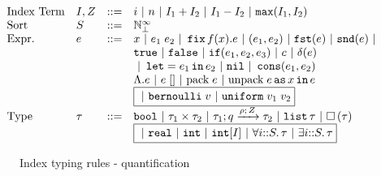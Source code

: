 \documentclass[a4paper,11pt]{article}
\theoremstyle{definition}
\begin{document}
\[\begin{array}{llll}
\mbox{Index Term} & \idx, \nnatA & ::= &     i ~|~ n ~|~ \idx_1 + \idx_2 ~|~  \idx_1
                                 - \idx_2 ~|~ \smax{\idx_1}{\idx_2}\\
  \mbox{Sort} & S & ::= & \natbi \\
\mbox{Expr.} & \expr & ::= & x ~|~ \expr_1 \eapp \expr_2 ~|~ \efix f(x).\expr
 						~|~ (\expr_1, \expr_2) ~|~ \eprojl(\expr) ~|~ \eprojr(\expr) ~| \\
%
& & & 					\etrue ~|~ \efalse ~|~ \eif(\expr_1, \expr_2, \expr_3) 
						~|~ \econst ~|~ \eop(\expr) \\
& & & 					~|~ \elet  = \expr_1 \ein \expr_2 ~|~ \enil ~|~  \econs (
      					\expr_1, \expr_2)  \\
& & &  \eilam \expr  ~|~  \expr \eapp []  ~|~
                            \epack \expr ~|~ \eunpack \expr \eas x
                            \ein \expr \\
& & & \boxed{~|~ \bernoulli \eapp \valr ~|~ \uniform \eapp \valr_1 \eapp \valr_2}\\      
%
  \mbox{Type} & \type & ::= & \tbool ~|~ \type_1 \times
  \type_2 ~|~ \tarr{\type_1}{\type_2}{\nnatbiA}{\dmap}{\nnatA} ~|~
                              \tlist{\type} ~|~ \tbox{\type}\\
& & &                  \boxed{ ~|~  \treal ~|~	\tint ~|~   \tint[I]  ~|~      \tforall{i} \type  ~|~ \texists{i} \type      } 
%
\end{array}\]
\begin{figure}
  \caption{Index typing rules - quantification}
  \label{fig:type-rules-quant}
\end{figure}
\end{document}
